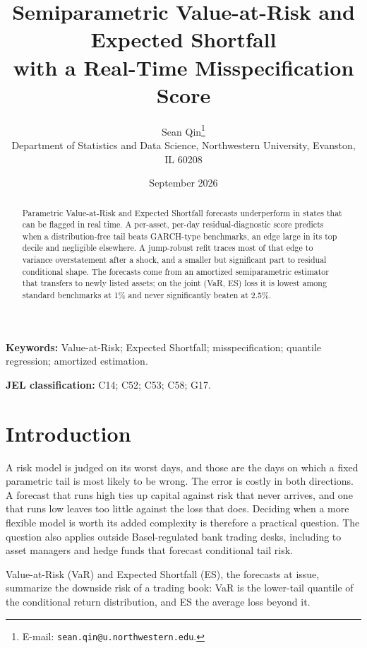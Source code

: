 \documentclass[11pt]{article}
\title{Semiparametric Value-at-Risk and Expected Shortfall\\
with a Real-Time Misspecification Score}
\author{%
  Sean Qin\thanks{E-mail: \texttt{sean.qin@u.northwestern.edu}.}\\[4pt]
  \normalsize Department of Statistics and Data Science, Northwestern
  University, Evanston, IL 60208}
\date{September 2026}
\theoremstyle{remark}
\begin{document}
\maketitle
\let\footnote\endnote

\begin{abstract}
Parametric Value-at-Risk and Expected Shortfall forecasts underperform in states that can be flagged in real time. A per-asset, per-day residual-diagnostic
score predicts when a distribution-free tail beats
GARCH-type benchmarks, an edge large in its top decile and negligible
elsewhere. A jump-robust refit traces most of that edge to variance
overstatement after a shock, and a smaller but significant part to residual
conditional shape. The forecasts come from an amortized semiparametric estimator that transfers to newly listed assets; on the joint (VaR, ES) loss it is lowest among standard benchmarks at 1\% and never significantly beaten at 2.5\%.
\end{abstract}

\noindent\textbf{Keywords:} Value-at-Risk; Expected Shortfall;
misspecification; quantile regression; amortized estimation.

\medskip
\noindent\textbf{JEL classification:} C14; C52; C53; C58; G17.

\section*{Introduction}\label{sec:intro}

A risk model is judged on its worst days, and those are the days on which
a fixed parametric tail is most likely to be wrong. The error is costly in
both directions. A forecast that runs high ties up capital against risk
that never arrives, and one that runs low leaves too little against the
loss that does. Deciding when a more flexible model is worth its added
complexity is therefore a practical question. The question also applies outside Basel-regulated bank trading desks, including to asset managers and hedge funds that forecast conditional tail risk.

Value-at-Risk (VaR) and Expected Shortfall
(ES), the forecasts at issue, summarize the downside risk of a trading
book: VaR is the lower-tail quantile of the conditional return distribution, and
ES the average loss beyond it.
\end{document}
